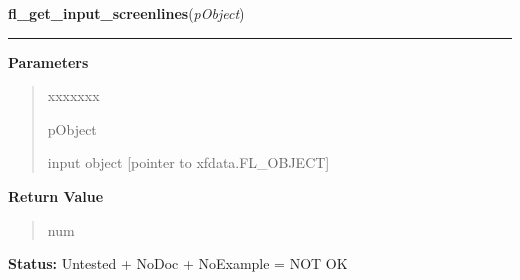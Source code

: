 \hspace{.8\funcindent}\begin{boxedminipage}{\funcwidth}

    \raggedright \textbf{fl\_get\_input\_screenlines}(\textit{pObject})

    \vspace{-1.5ex}

    \rule{\textwidth}{0.5\fboxrule}
\setlength{\parskip}{2ex}
\setlength{\parskip}{1ex}
      \textbf{Parameters}
      \vspace{-1ex}

      \begin{quote}
        \begin{Ventry}{xxxxxxx}

          \item[pObject]

          input object [pointer to xfdata.FL\_OBJECT]

        \end{Ventry}

      \end{quote}

      \textbf{Return Value}
    \vspace{-1ex}

      \begin{quote}
      num

      \end{quote}

\textbf{Status:} Untested + NoDoc + NoExample = NOT OK



    \end{boxedminipage}

    \label{xformslib:library:fl_get_input_cursorpos}

    \vspace{0.5ex}

